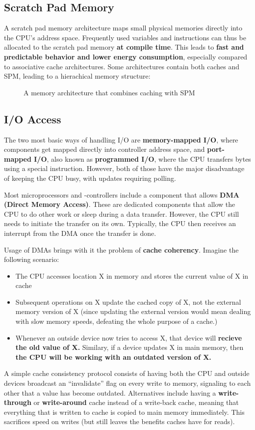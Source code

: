 \documentclass{report}
\newcommand{\tbf}{\textbf}
\newcommand*{\newpar}{\par\vspace{\baselineskip}\noindent} %
\begin{document}
\subsection{Scratch Pad Memory}
A scratch pad memory architecture maps small physical memories directly into the CPU's address space. Frequently used variables and instructions can thus be allocated to the scratch pad memory \tbf{at compile time}. This leads to \tbf{fast and predictable behavior and lower energy consumption}, especially compared to associative cache architectures. Some architectures contain both caches and SPM, leading to a hierachical memory structure:
\begin{figure}[h!]
\centering

\caption{A memory architecture that combines caching with SPM}
\label{fig:memoryhierarchy}
\end{figure}
%
\subsection{I/O Access}
The two most basic ways of handling I/O are \tbf{memory-mapped I/O}, where components get mapped directly into controller address space, and \tbf{port-mapped I/O}, also known as \tbf{programmed I/O}, where the CPU transfers bytes using a special instruction. However, both of those have the major disadvantage of keeping the CPU busy, with updates requiring polling.
\newpar
Most microprocessors and -controllers include a component that allows \tbf{DMA (Direct Memory Access)}. These are dedicated components that allow the CPU to do other work or sleep during a data transfer. However, the CPU still needs to initiate the transfer on its own. Typically, the CPU then receives an interrupt from the DMA once the transfer is done.
\newpar
Usage of DMAs brings with it the problem of \tbf{cache coherency}. Imagine the following scenario:
\begin{itemize}
 \item The CPU accesses location X in memory and stores the current value of X in cache
 \item Subsequent operations on X update the cached copy of X, not the external memory version of X (since updating the external version would mean dealing with slow memory speeds, defeating the whole purpose of a cache.)
 \item Whenever an outside device now tries to access X, that device will \tbf{recieve the old value of X.} Similary, if a device updates X in main memory, then \tbf{the CPU will be working with an outdated version of X.}
\end{itemize}
A simple cache consistency protocol consists of having both the CPU and outside devices broadcast an ``invalidate'' flag on every write to memory, signaling to each other that a value has become outdated. Alternatives include having a \tbf{write-through} or \tbf{write-around} cache instead of a write-back cache, meaning that everything that is written to cache is copied to main memory immediately. This sacrifices speed on writes (but still leaves the benefits caches have for reads).
%
\end{document}
